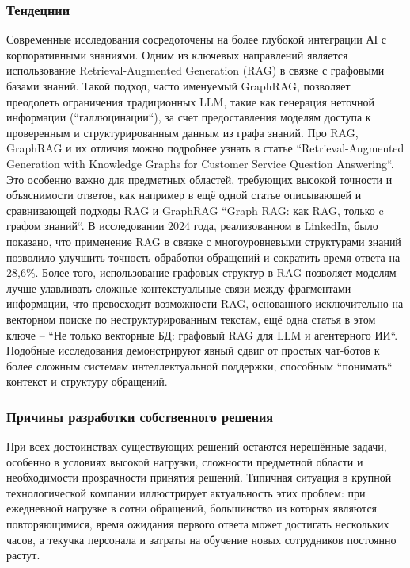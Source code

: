 \subsubsection{Тендецнии}

Современные исследования сосредоточены на более глубокой интеграции АІ с корпоративными знаниями. Одним из ключевых направлений является использование Retrieval-Augmented Generation (RAG) в связке с графовыми базами знаний. Такой подход, часто именуемый GraphRAG, позволяет преодолеть ограничения традиционных LLM, такие как генерация неточной информации (``галлюцинации``), за счет предоставления моделям доступа к проверенным и структурированным данным из графа знаний. Про RAG, GraphRAG и их отличия можно подробнее узнать в статье ``Retrieval-Augmented Generation with Knowledge Graphs for Customer Service Question Answering``\cite{arxiv}. Это особенно важно для предметных областей, требующих высокой точности и объяснимости ответов, как например в ещё одной статье описывающей и сравнивающей подходы  RAG и GraphRAG ``Graph RAG: как RAG, только c графом знаний``\cite{epsilonGRAG}. В исследовании 2024 года, реализованном в LinkedIn, было показано, что применение RAG в связке с многоуровневыми структурами знаний позволило улучшить точность обработки обращений и сократить время ответа на 28,6\%. Более того, использование графовых структур в RAG позволяет моделям лучше улавливать сложные контекстуальные связи между фрагментами информации, что превосходит возможности RAG, основанного исключительно на векторном поиске по неструктурированным текстам, ещё одна статья в этом ключе -- ``Не только векторные БД: графовый RAG для LLM и агентерного ИИ``\cite{vectorBd}. Подобные исследования демонстрируют явный сдвиг от простых чат-ботов к более сложным системам интеллектуальной поддержки, способным ``понимать`` контекст и структуру обращений.

\subsubsection{Причины разработки собственного решения}

При всех достоинствах существующих решений остаются нерешённые задачи, особенно в условиях высокой нагрузки, сложности предметной области и необходимости прозрачности принятия решений. Типичная ситуация в крупной технологической компании иллюстрирует актуальность этих проблем: при ежедневной нагрузке в сотни обращений, большинство из которых являются повторяющимися, время ожидания первого ответа может достигать нескольких часов, а текучка персонала и затраты на обучение новых сотрудников постоянно растут.

